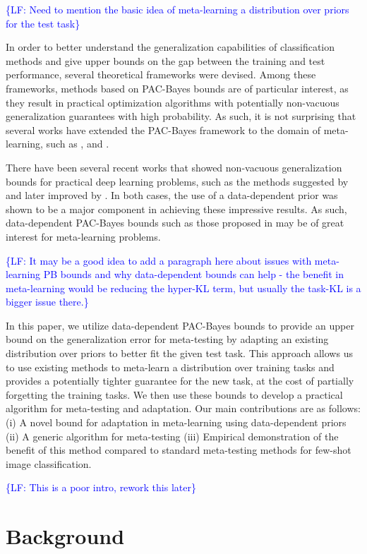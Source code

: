 \documentclass{article}
\theoremstyle{definition}
\newcommand{\LF}[1]{\textcolor{blue}{\{LF: #1\}}}
\begin{document}
\LF{Need to mention the basic idea of meta-learning a distribution over priors for the test task}

In order to better understand the generalization capabilities of classification methods and give upper bounds on the gap between the training and test performance, several theoretical frameworks were devised.  Among these frameworks, methods based on PAC-Bayes bounds \citep{Mcallester} are of particular interest, as they result in practical optimization algorithms with potentially non-vacuous generalization guarantees with high probability. As such, it is not surprising that several works have extended the PAC-Bayes framework to the domain of meta-learning, such as \citet{Pentina2014}, \citet{Amit2018} and \citet{Rothfuss2020}.

There have been several recent works that showed non-vacuous generalization bounds for practical deep learning problems, such as the methods suggested by \citet{Dziugaite2017} and later improved by \citet{Perez-Ortiz2021}. In both cases, the use of a data-dependent prior was shown to be a major component in achieving these impressive results. As such, data-dependent PAC-Bayes bounds such as those proposed in \citet{Rivasplata2020} may be of great interest for meta-learning problems.

\LF{It may be a good idea to add a paragraph here about issues with meta-learning PB bounds and why data-dependent bounds can help - the benefit in meta-learning would be reducing the hyper-KL term, but usually the task-KL is a bigger issue there.}

In this paper, we utilize data-dependent PAC-Bayes bounds to provide an upper bound on the generalization error for meta-testing by adapting an existing distribution over priors to better fit the given test task. This approach allows us to use existing methods to meta-learn a distribution over training tasks and provides a potentially tighter guarantee for the new task, at the cost of partially forgetting the training tasks. 
We then use these bounds to develop a practical algorithm for meta-testing and adaptation.
Our main contributions are as follows: (i) A novel bound for adaptation in meta-learning using data-dependent priors (ii) A generic algorithm for meta-testing (iii) Empirical demonstration of the benefit of this method compared to standard meta-testing methods for few-shot image classification.

\LF{This is a poor intro, rework this later}

\section{Background} %
\end{document}
